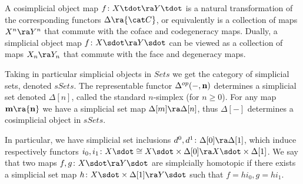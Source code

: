 {A cosimplicial object map $f \colon X\tdot \ra Y\tdot$ is a natural transformation of the corresponding functors $\Delta \ra {\cat C}$, or equivalently is a collection of maps $X^n \ra Y^n$ that commute with the coface and codegeneracy maps. Dually, a simplicial object map $f \colon X\sdot \ra Y\sdot$ can be viewed as a collection of maps $X_n \ra Y_n$ that commute with the face and degeneracy maps.
} %

Taking in particular simplicial objects in $Sets$ we get the category of simplicial sets, denoted $sSets$. The representable functor ${\Delta^{op}}(-, {\bf n})$ determines a simplicial set denoted $\Delta[n]$, called the standard $n$-simplex (for $n \ge 0$). For any map ${\bf m} \ra {\bf n}$ we have a simplicial set map $\Delta[m] \ra \Delta[n]$, thus $\Delta[-]$ determines a cosimplicial object in $sSets$.

In particular, we have simplicial set inclusions $d^0, d^1 \colon \Delta[0] \ra \Delta[1]$, which induce respectively functors $i_0, i_1 \colon X\sdot \cong X\sdot \times \Delta[0] \ra  X\sdot \times \Delta[1]$. We say that two maps $f, g \colon X\sdot \ra Y\sdot$ are simplcially homotopic if there exists a simplicial set map $h \colon X\sdot \times \Delta[1] \ra Y\sdot$ such that $f = hi_0, g = hi_1$. 




